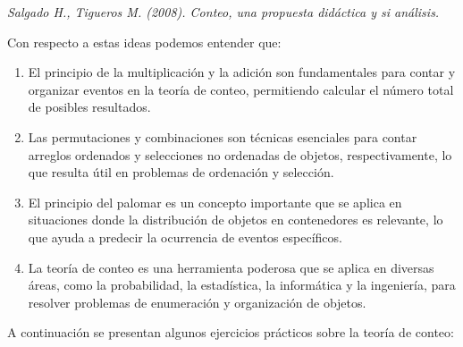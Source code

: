 \documentclass[11pt, a4paper]{article}
\begin{document}
  \begin{flushright}
    \textit{Salgado H., Tigueros M. (2008). Conteo, una propuesta didáctica y si análisis.}
  \end{flushright}

Con respecto a estas ideas podemos entender que:

  \begin{enumerate}
    \item El principio de la multiplicación y la adición son fundamentales para contar y organizar eventos en la teoría de conteo, permitiendo calcular el número total de posibles resultados.
    \item Las permutaciones y combinaciones son técnicas esenciales para contar arreglos ordenados y selecciones no ordenadas de objetos, respectivamente, lo que resulta útil en problemas de ordenación y selección.
    \item El principio del palomar es un concepto importante que se aplica en situaciones donde la distribución de objetos en contenedores es relevante, lo que ayuda a predecir la ocurrencia de eventos específicos.
    \item La teoría de conteo es una herramienta poderosa que se aplica en diversas áreas, como la probabilidad, la estadística, la informática y la ingeniería, para resolver problemas de enumeración y organización de objetos.
  \end{enumerate}

  A continuación se presentan algunos ejercicios prácticos sobre la teoría de conteo:

  \newpage
\end{document}

